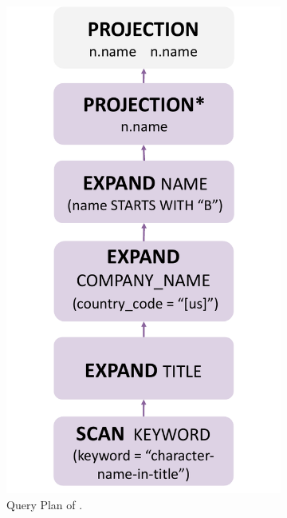\begin{figure}[ht]
    \centering
    \begin{subfigure}[b]{.4\linewidth}
        \centering
        \includegraphics[width=.9\linewidth]{./figures/job17a-plan-gopt.pdf}
        \caption{Query Plan of \name.}
        \label{fig:job17a-plan-relgo}
    \end{subfigure}
    \begin{subfigure}[b]{.5\linewidth}
        \centering

\end{subfigure}
\end{figure}
